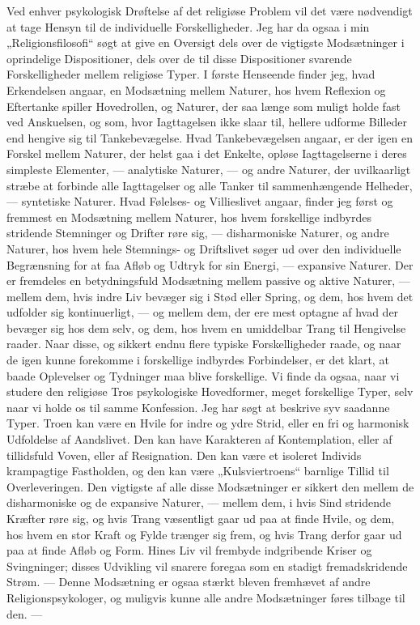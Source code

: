 \documentclass[12pt,a4paper]{article}
\newcommand{\opage}[1]{\marginnote{\footnotesize\textit{[#1]}}}
\begin{document}
Ved enhver psykologisk Drøftelse af det religiøse Problem vil det være
nødvendigt at tage Hensyn til de individuelle Forskelligheder. Jeg har da ogsaa
i min „Religionsfilosofi“ søgt at give en Oversigt dels over de \opage{50} vigtigste
Modsætninger i oprindelige Dispositioner, dels over de til disse Dispositioner
svarende Forskelligheder mellem religiøse Typer. I første Henseende finder jeg,
hvad Erkendelsen angaar, en Modsætning mellem Naturer, hos hvem Reflexion og
Eftertanke spiller Hovedrollen, og Naturer, der saa længe som muligt holde fast
ved Anskuelsen, og som, hvor Iagttagelsen ikke slaar til, hellere udforme
Billeder end hengive sig til Tankebevægelse. Hvad Tankebevægelsen angaar, er der
igen en Forskel mellem Naturer, der helst gaa i det Enkelte, opløse
Iagttagelserne i deres simpleste Elementer, --- analytiske Naturer, --- og andre
Naturer, der uvilkaarligt stræbe at forbinde alle Iagttagelser og alle Tanker
til sammenhængende Helheder, --- syntetiske Naturer. Hvad Følelses- og
Villieslivet angaar, finder jeg først og fremmest en Modsætning mellem Naturer,
hos hvem forskellige indbyrdes stridende Stemninger og Drifter røre sig, ---
disharmoniske Naturer, og andre Naturer, hos hvem hele Stemnings- og Driftslivet
søger ud over den individuelle Begrænsning for at faa Afløb og Udtryk for sin
Energi, --- expansive Naturer. Der er fremdeles en betydningsfuld Modsætning
mellem passive og aktive Naturer, --- mellem dem, hvis indre Liv bevæger sig i
Stød eller Spring, og dem, hos hvem det udfolder sig kontinuerligt, --- og
mellem dem, der ere mest optagne af hvad der bevæger sig hos dem selv, og dem,
hos hvem en umiddelbar Trang til Hengivelse raader. Naar disse, og sikkert endnu
flere typiske Forskelligheder raade, og naar de igen kunne forekomme i
forskellige indbyrdes Forbindelser, er det klart, at baade Oplevelser og
Tydninger maa blive forskellige. Vi finde da ogsaa, naar vi studere den
religiøse Tros psykologiske Hovedformer, meget forskellige Typer, selv naar vi
holde os til samme Konfession. Jeg har søgt at beskrive syv saadanne Typer.
Troen kan være en Hvile for indre og ydre Strid, eller en fri og harmonisk
Udfoldelse af Aandslivet. Den kan \opage{51} have Karakteren af Kontemplation, eller af
tillidsfuld Voven, eller af Resignation. Den kan være et isoleret Individs
krampagtige Fastholden, og den kan være „Kulsviertroens“ barnlige Tillid til
Overleveringen. Den vigtigste af alle disse Modsætninger er sikkert den mellem
de disharmoniske og de expansive Naturer, --- mellem dem, i hvis Sind stridende
Kræfter røre sig, og hvis Trang væsentligt gaar ud paa at finde Hvile, og dem,
hos hvem en stor Kraft og Fylde trænger sig frem, og hvis Trang derfor gaar ud
paa at finde Afløb og Form. Hines Liv vil frembyde indgribende Kriser og
Svingninger; disses Udvikling vil snarere foregaa som en stadigt fremadskridende
Strøm. --- Denne Modsætning er ogsaa stærkt bleven fremhævet af andre
Religionspsykologer, og muligvis kunne alle andre Modsætninger føres tilbage til
den. ---
\end{document}

